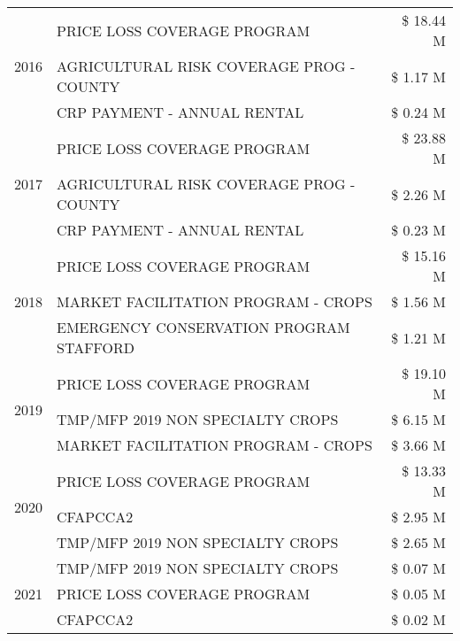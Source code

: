 \begin{tabular}{llr}
\cline{1-3}
\multirow[t]{3}{*}{2016} & PRICE LOSS COVERAGE PROGRAM                   & \$ 18.44 M \\
 & AGRICULTURAL RISK COVERAGE PROG - COUNTY      & \$ 1.17 M \\
 & CRP PAYMENT - ANNUAL RENTAL                   & \$ 0.24 M \\
\cline{1-3}
\multirow[t]{3}{*}{2017} & PRICE LOSS COVERAGE PROGRAM & \$ 23.88 M \\
 & AGRICULTURAL RISK COVERAGE PROG - COUNTY & \$ 2.26 M \\
 & CRP PAYMENT - ANNUAL RENTAL & \$ 0.23 M \\
\cline{1-3}
\multirow[t]{3}{*}{2018} & PRICE LOSS COVERAGE PROGRAM & \$ 15.16 M \\
 & MARKET FACILITATION PROGRAM - CROPS & \$ 1.56 M \\
 & EMERGENCY CONSERVATION PROGRAM STAFFORD & \$ 1.21 M \\
\cline{1-3}
\multirow[t]{3}{*}{2019} & PRICE LOSS COVERAGE PROGRAM & \$ 19.10 M \\
 & TMP/MFP 2019 NON SPECIALTY CROPS & \$ 6.15 M \\
 & MARKET FACILITATION PROGRAM - CROPS & \$ 3.66 M \\
\cline{1-3}
\multirow[t]{3}{*}{2020} & PRICE LOSS COVERAGE PROGRAM & \$ 13.33 M \\
 & CFAPCCA2 & \$ 2.95 M \\
 & TMP/MFP 2019 NON SPECIALTY CROPS & \$ 2.65 M \\
\cline{1-3}
\multirow[t]{3}{*}{2021} & TMP/MFP 2019 NON SPECIALTY CROPS & \$ 0.07 M \\
 & PRICE LOSS COVERAGE PROGRAM & \$ 0.05 M \\
 & CFAPCCA2 & \$ 0.02 M \\
\cline{1-3}
\bottomrule
\end{tabular}
